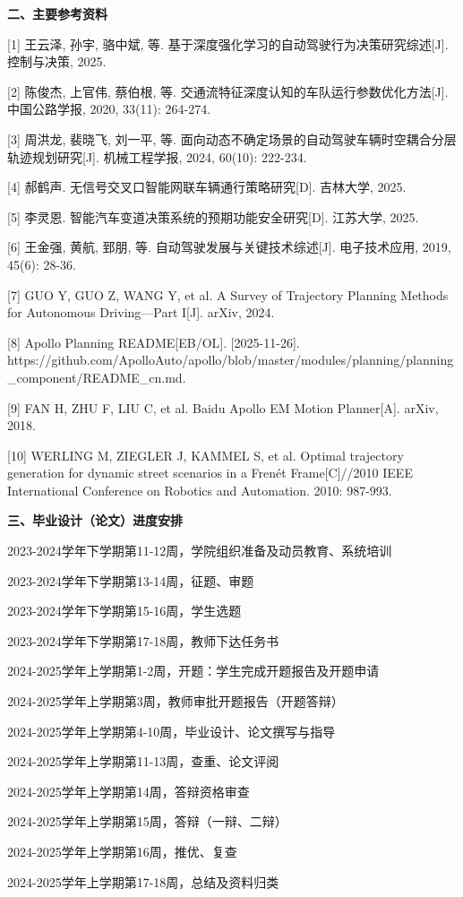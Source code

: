\documentclass[a4paper,12pt]{article}
\begin{document}
\vspace{12pt}
{\bfseries 二、主要参考资料}

\setlength{\parindent}{0pt}

[1] 王云泽, 孙宇, 骆中斌, 等. 基于深度强化学习的自动驾驶行为决策研究综述[J]. 控制与决策, 2025.

[2] 陈俊杰, 上官伟, 蔡伯根, 等. 交通流特征深度认知的车队运行参数优化方法[J]. 中国公路学报, 2020, 33(11): 264-274.

[3] 周洪龙, 裴晓飞, 刘一平, 等. 面向动态不确定场景的自动驾驶车辆时空耦合分层轨迹规划研究[J]. 机械工程学报, 2024, 60(10): 222-234.

[4] 郝鹤声. 无信号交叉口智能网联车辆通行策略研究[D]. 吉林大学, 2025.

[5] 李灵恩. 智能汽车变道决策系统的预期功能安全研究[D]. 江苏大学, 2025.

[6] 王金强, 黄航, 郅朋, 等. 自动驾驶发展与关键技术综述[J]. 电子技术应用, 2019, 45(6): 28-36.

[7] GUO Y, GUO Z, WANG Y, et al. A Survey of Trajectory Planning Methods for Autonomous Driving---Part I[J]. arXiv, 2024.

[8] Apollo Planning README[EB/OL]. [2025-11-26]. https://github.com/ApolloAuto/apollo/blob/master/modules/planning/planning\_component/README\_cn.md.

[9] FAN H, ZHU F, LIU C, et al. Baidu Apollo EM Motion Planner[A]. arXiv, 2018.

[10] WERLING M, ZIEGLER J, KAMMEL S, et al. Optimal trajectory generation for dynamic street scenarios in a Frenét Frame[C]//2010 IEEE International Conference on Robotics and Automation. 2010: 987-993.

\setlength{\parindent}{2em}

\vspace{12pt}
{\bfseries 三、毕业设计（论文）进度安排}

\setlength{\parindent}{0pt}

2023-2024学年下学期第11-12周，学院组织准备及动员教育、系统培训

2023-2024学年下学期第13-14周，征题、审题

2023-2024学年下学期第15-16周，学生选题

2023-2024学年下学期第17-18周，教师下达任务书

2024-2025学年上学期第1-2周，开题：学生完成开题报告及开题申请

2024-2025学年上学期第3周，教师审批开题报告（开题答辩）

2024-2025学年上学期第4-10周，毕业设计、论文撰写与指导

2024-2025学年上学期第11-13周，查重、论文评阅

2024-2025学年上学期第14周，答辩资格审查

2024-2025学年上学期第15周，答辩（一辩、二辩）

2024-2025学年上学期第16周，推优、复查

2024-2025学年上学期第17-18周，总结及资料归类
\end{document}
